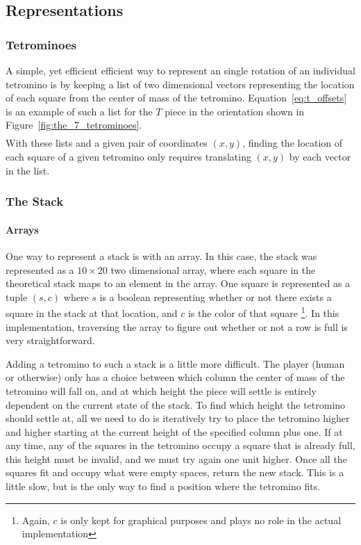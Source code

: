 \documentclass[fontsize=12pt]{article}
\begin{document}
\subsection{Representations}
\label{sub:representations}
\subsubsection{Tetrominoes}
\label{ssub:tetrominoes}

\par A simple, yet efficient efficient way to represent an single rotation of an individual tetromino is by keeping a list of two dimensional vectors representing the location of each square from the center of mass of the tetromino. Equation~\ref{eq:t_offsets} is an example of such a list for the $T$ piece in the orientation shown in Figure~\ref{fig:the_7_tetrominoes}.
\begin{align}
  [(0,0), (-1, 0), (0, 1), (1, 0)]\label{eq:t_offsets}
\end{align}
With these lists and a given pair of coordinates $(x,y)$, finding the location of each square of a given tetromino only requires translating $(x,y)$ by each vector in the list.

\subsubsection{The Stack}
\label{ssub:the_stack}
\paragraph{Arrays}
\label{par:arrays}
One way to represent a stack is with an array. In this case, the stack was represented as a $10\times 20$ two dimensional array, where each square in the theoretical stack maps to an element in the array. One square is represented as a tuple $(s,c)$ where $s$ is a boolean representing whether or not there exists a square in the stack at that location, and $c$ is the color of that square \footnote{Again, $c$ is only kept for graphical purposes and plays no role in the actual implementation}. In this implementation, traversing the array to figure out whether or not a row is full is very straightforward.
\par Adding a tetromino to such a stack is a little more difficult. The player (human or otherwise) only has a choice between which column the center of mass of the tetromino will fall on, and at which height the piece will settle is entirely dependent on the current state of the stack. To find which height the tetromino should settle at, all we need to do is iteratively try to place the tetromino higher and higher starting at the current height of the specified column plus one. If at any time, any of the squares in the tetromino occupy a square that is already full, this height must be invalid, and we must try again one unit higher. Once all the squares fit and occupy what were empty spaces, return the new stack. This is a little slow, but is the only way to find a position where the tetromino fits.
\end{document}
